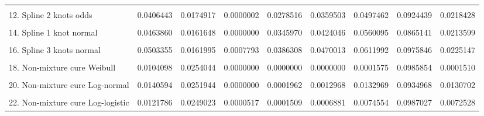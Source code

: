\documentclass[]{article}
\begin{document}
\begin{table}
\begin{tabular}[t]{lrrrrrrrr}
\cellcolor{gray!6}{11. Spline 1 knot odds} & \cellcolor{gray!6}{0.0410014} & \cellcolor{gray!6}{0.0174571} & \cellcolor{gray!6}{0.0000002} & \cellcolor{gray!6}{0.0281269} & \cellcolor{gray!6}{0.0363823} & \cellcolor{gray!6}{0.0502992} & \cellcolor{gray!6}{0.0917044} & \cellcolor{gray!6}{0.0221203}\\
12. Spline 2 knots odds & 0.0406443 & 0.0174917 & 0.0000002 & 0.0278516 & 0.0359503 & 0.0497462 & 0.0924439 & 0.0218428\\
\cellcolor{gray!6}{13. Spline 3 knots odds} & \cellcolor{gray!6}{0.0497623} & \cellcolor{gray!6}{0.0176792} & \cellcolor{gray!6}{0.0003253} & \cellcolor{gray!6}{0.0358147} & \cellcolor{gray!6}{0.0466608} & \cellcolor{gray!6}{0.0638606} & \cellcolor{gray!6}{0.0999099} & \cellcolor{gray!6}{0.0279854}\\
14. Spline 1 knot normal & 0.0463860 & 0.0161648 & 0.0000000 & 0.0345970 & 0.0424046 & 0.0560095 & 0.0865141 & 0.0213599\\
\cellcolor{gray!6}{15. Spline 2 knots normal} & \cellcolor{gray!6}{0.0400250} & \cellcolor{gray!6}{0.0171948} & \cellcolor{gray!6}{0.0000006} & \cellcolor{gray!6}{0.0281480} & \cellcolor{gray!6}{0.0348987} & \cellcolor{gray!6}{0.0473455} & \cellcolor{gray!6}{0.0953359} & \cellcolor{gray!6}{0.0191484}\\
16. Spline 3 knots normal & 0.0503355 & 0.0161995 & 0.0007793 & 0.0386308 & 0.0470013 & 0.0611992 & 0.0975846 & 0.0225147\\
\cellcolor{gray!6}{17. Mixture cure Weibull} & \cellcolor{gray!6}{0.0103115} & \cellcolor{gray!6}{0.0253657} & \cellcolor{gray!6}{0.0000000} & \cellcolor{gray!6}{0.0000000} & \cellcolor{gray!6}{0.0000000} & \cellcolor{gray!6}{0.0001031} & \cellcolor{gray!6}{0.0987558} & \cellcolor{gray!6}{0.0000986}\\
18. Non-mixture cure Weibull & 0.0104098 & 0.0254044 & 0.0000000 & 0.0000000 & 0.0000000 & 0.0001575 & 0.0985854 & 0.0001510\\
\cellcolor{gray!6}{19. Mixture cure Log-normal} & \cellcolor{gray!6}{0.0135710} & \cellcolor{gray!6}{0.0252751} & \cellcolor{gray!6}{0.0000000} & \cellcolor{gray!6}{0.0000929} & \cellcolor{gray!6}{0.0008027} & \cellcolor{gray!6}{0.0116086} & \cellcolor{gray!6}{0.0931907} & \cellcolor{gray!6}{0.0114404}\\
20. Non-mixture cure Log-normal & 0.0140594 & 0.0251944 & 0.0000000 & 0.0001962 & 0.0012968 & 0.0132969 & 0.0934968 & 0.0130702\\
\cellcolor{gray!6}{21. Mixture cure Log-logistic} & \cellcolor{gray!6}{0.0122019} & \cellcolor{gray!6}{0.0249146} & \cellcolor{gray!6}{0.0000516} & \cellcolor{gray!6}{0.0001512} & \cellcolor{gray!6}{0.0006917} & \cellcolor{gray!6}{0.0075147} & \cellcolor{gray!6}{0.0986522} & \cellcolor{gray!6}{0.0073113}\\
22. Non-mixture cure Log-logistic & 0.0121786 & 0.0249023 & 0.0000517 & 0.0001509 & 0.0006881 & 0.0074554 & 0.0987027 & 0.0072528\\
\bottomrule
\end{tabular}
\end{table}
\end{document}
